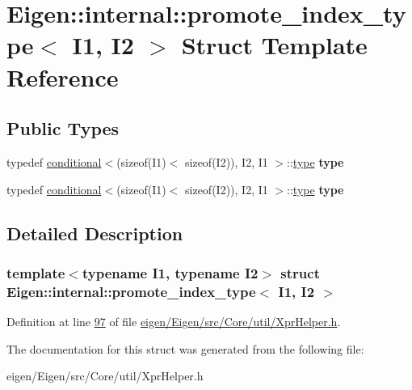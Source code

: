 \hypertarget{struct_eigen_1_1internal_1_1promote__index__type}{}\section{Eigen\+:\+:internal\+:\+:promote\+\_\+index\+\_\+type$<$ I1, I2 $>$ Struct Template Reference}
\label{struct_eigen_1_1internal_1_1promote__index__type}
\subsection*{Public Types}
\begin{DoxyCompactItemize}
\item 
\mbox{\label{struct_eigen_1_1internal_1_1promote__index__type_a191fd87e6a78044bf2c6214682be09e2}} 
typedef \hyperlink{struct_eigen_1_1internal_1_1conditional}{conditional}$<$(sizeof(I1)$<$ sizeof(I2)), I2, I1 $>$\+::\hyperlink{struct_eigen_1_1internal_1_1conditional}{type} {\bfseries type}
\item 
\mbox{\label{struct_eigen_1_1internal_1_1promote__index__type_a191fd87e6a78044bf2c6214682be09e2}} 
typedef \hyperlink{struct_eigen_1_1internal_1_1conditional}{conditional}$<$(sizeof(I1)$<$ sizeof(I2)), I2, I1 $>$\+::\hyperlink{struct_eigen_1_1internal_1_1conditional}{type} {\bfseries type}
\end{DoxyCompactItemize}


\subsection{Detailed Description}
\subsubsection*{template$<$typename I1, typename I2$>$\newline
struct Eigen\+::internal\+::promote\+\_\+index\+\_\+type$<$ I1, I2 $>$}



Definition at line \hyperlink{eigen_2_eigen_2src_2_core_2util_2_xpr_helper_8h_source_l00097}{97} of file \hyperlink{eigen_2_eigen_2src_2_core_2util_2_xpr_helper_8h_source}{eigen/\+Eigen/src/\+Core/util/\+Xpr\+Helper.\+h}.



The documentation for this struct was generated from the following file\+:\begin{DoxyCompactItemize}
\item 
eigen/\+Eigen/src/\+Core/util/\+Xpr\+Helper.\+h\end{DoxyCompactItemize}
